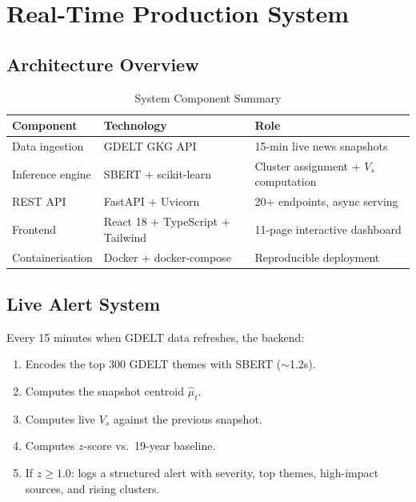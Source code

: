 \documentclass[12pt,a4paper]{article}
\begin{document}
\section{Real-Time Production System}

\subsection{Architecture Overview}

\begin{table}[H]
\centering
\caption{System Component Summary}
\begin{tabular}{lll}
\toprule
\textbf{Component} & \textbf{Technology} & \textbf{Role} \\
\midrule
Data ingestion     & GDELT GKG API         & 15-min live news snapshots \\
Inference engine   & SBERT + scikit-learn  & Cluster assignment + $V_s$ computation \\
REST API           & FastAPI + Uvicorn     & 20+ endpoints, async serving \\
Frontend           & React 18 + TypeScript + Tailwind & 11-page interactive dashboard \\
Containerisation   & Docker + docker-compose & Reproducible deployment \\
\bottomrule
\end{tabular}
\label{tab:system}
\end{table}

\subsection{Live Alert System}

Every 15 minutes when GDELT data refreshes, the backend:

\begin{enumerate}[leftmargin=2em]
    \item Encodes the top 300 GDELT themes with SBERT ($\sim$1.2s).
    \item Computes the snapshot centroid $\hat{\mu}_t$.
    \item Computes live $V_s$ against the previous snapshot.
    \item Computes $z$-score vs.\ 19-year baseline.
    \item If $z \geq 1.0$: logs a structured alert with severity, top themes, high-impact sources, and rising clusters.
\end{enumerate}
\end{document}
